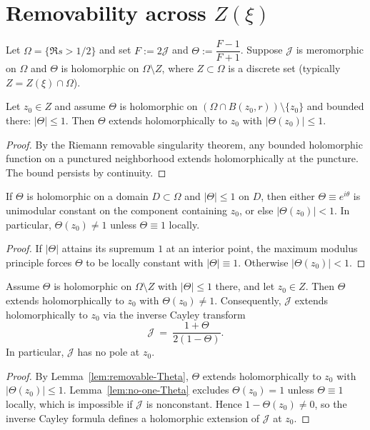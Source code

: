 
\section*{Removability across $Z(\xi)$}

Let $\Omega=\{\Re s>1/2\}$ and set $F:=2\mathcal J$ and $\Theta:=\dfrac{F-1}{F+1}$. Suppose $\mathcal J$ is meromorphic on $\Omega$ and $\Theta$ is holomorphic on $\Omega\setminus Z$, where $Z\subset \Omega$ is a discrete set (typically $Z=Z(\xi)\cap\Omega$).

\begin{lemma}\label{lem:removable-Theta}
Let $z_0\in Z$ and assume $\Theta$ is holomorphic on $(\Omega\cap B(z_0,r))\setminus\{z_0\}$ and bounded there: $|\Theta|\le 1$. Then $\Theta$ extends holomorphically to $z_0$ with $|\Theta(z_0)|\le 1$.
\end{lemma}

\begin{proof}
By the Riemann removable singularity theorem, any bounded holomorphic function on a punctured neighborhood extends holomorphically at the puncture. The bound persists by continuity.
\end{proof}

\begin{lemma}[Excluding $\Theta(z_0)=1$ unless constant]\label{lem:no-one-Theta}
If $\Theta$ is holomorphic on a domain $D\subset\Omega$ and $|\Theta|\le1$ on $D$, then either $\Theta\equiv e^{i\theta}$ is unimodular constant on the component containing $z_0$, or else $|\Theta(z_0)|<1$. In particular, $\Theta(z_0)\ne1$ unless $\Theta\equiv1$ locally.
\end{lemma}

\begin{proof}
If $|\Theta|$ attains its supremum $1$ at an interior point, the maximum modulus principle forces $\Theta$ to be locally constant with $|\Theta|\equiv1$. Otherwise $|\Theta(z_0)|<1$.
\end{proof}

\begin{theorem}\label{thm:rem-J-across}
Assume $\Theta$ is holomorphic on $\Omega\setminus Z$ with $|\Theta|\le 1$ there, and let $z_0\in Z$. Then $\Theta$ extends holomorphically to $z_0$ with $\Theta(z_0)\ne 1$. Consequently, $\mathcal J$ extends holomorphically to $z_0$ via the inverse Cayley transform
\[\mathcal J\ =\ \frac{1+\Theta}{2(1-\Theta)}.\]
In particular, $\mathcal J$ has no pole at $z_0$.
\end{theorem}

\begin{proof}
By Lemma~\ref{lem:removable-Theta}, $\Theta$ extends holomorphically to $z_0$ with $|\Theta(z_0)|\le1$. Lemma~\ref{lem:no-one-Theta} excludes $\Theta(z_0)=1$ unless $\Theta\equiv 1$ locally, which is impossible if $\mathcal J$ is nonconstant. Hence $1-\Theta(z_0)\ne0$, so the inverse Cayley formula defines a holomorphic extension of $\mathcal J$ at $z_0$.
\end{proof}
